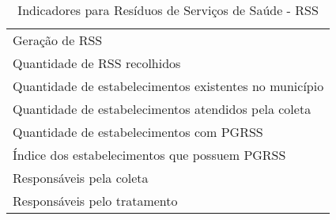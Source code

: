 \begin{table}[h!]
  \centering
  \caption{Indicadores para Resíduos de Serviços de Saúde - RSS}
    \begin{tabular}{|p{27em}|}
    \rowcolor[rgb]{ .984,  .831,  .706} \multicolumn{1}{p{27em}}{RESÍDUOS DE SERVIÇO DE SAÚDE} \\
    \midrule
    Geração de RSS \\
    \midrule
    Quantidade de RSS recolhidos \\
    \midrule
    Quantidade de estabelecimentos existentes no município \\
    \midrule
    Quantidade de estabelecimentos atendidos pela coleta \\
    \midrule
    Quantidade de estabelecimentos com PGRSS \\
    \midrule
    Índice dos estabelecimentos que possuem PGRSS \\
    \midrule
    Responsáveis pela coleta \\
    \midrule
    Responsáveis pelo tratamento \\
    \bottomrule
    \end{tabular}%
  \label{tab:ind_rss}%
\end{table}%
